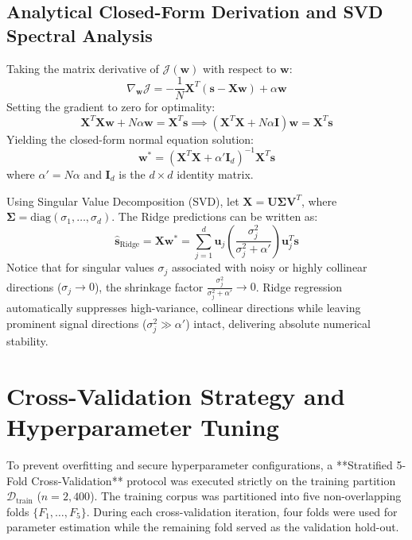 \documentclass[12pt,a4paper,oneside]{report}
\begin{document}
\subsection{Analytical Closed-Form Derivation and SVD Spectral Analysis}
Taking the matrix derivative of $\mathcal{J}(\mathbf{w})$ with respect to $\mathbf{w}$:
\begin{equation}
    \nabla_{\mathbf{w}} \mathcal{J} = -\frac{1}{N} \mathbf{X}^T (\mathbf{s} - \mathbf{X}\mathbf{w}) + \alpha \mathbf{w}
\end{equation}
Setting the gradient to zero for optimality:
\begin{equation}
    \mathbf{X}^T \mathbf{X}\mathbf{w} + N\alpha \mathbf{w} = \mathbf{X}^T \mathbf{s} \implies \left( \mathbf{X}^T \mathbf{X} + N\alpha \mathbf{I} \right) \mathbf{w} = \mathbf{X}^T \mathbf{s}
\end{equation}
Yielding the closed-form normal equation solution:
\begin{equation}
    \mathbf{w}^* = \left( \mathbf{X}^T \mathbf{X} + \alpha' \mathbf{I}_d \right)^{-1} \mathbf{X}^T \mathbf{s}
    \label{eq:ridge_solution}
\end{equation}
where $\alpha' = N\alpha$ and $\mathbf{I}_d$ is the $d \times d$ identity matrix.

Using Singular Value Decomposition (SVD), let $\mathbf{X} = \mathbf{U} \mathbf{\Sigma} \mathbf{V}^T$, where $\mathbf{\Sigma} = \text{diag}(\sigma_1, \dots, \sigma_d)$. The Ridge predictions can be written as:
\begin{equation}
    \hat{\mathbf{s}}_{\text{Ridge}} = \mathbf{X} \mathbf{w}^* = \sum_{j=1}^d \mathbf{u}_j \left( \frac{\sigma_j^2}{\sigma_j^2 + \alpha'} \right) \mathbf{u}_j^T \mathbf{s}
\end{equation}
Notice that for singular values $\sigma_j$ associated with noisy or highly collinear directions ($\sigma_j \to 0$), the shrinkage factor $\frac{\sigma_j^2}{\sigma_j^2 + \alpha'} \to 0$. Ridge regression automatically suppresses high-variance, collinear directions while leaving prominent signal directions ($\sigma_j^2 \gg \alpha'$) intact, delivering absolute numerical stability.

\section{Cross-Validation Strategy and Hyperparameter Tuning}
\label{sec:cross_validation}
To prevent overfitting and secure hyperparameter configurations, a **Stratified 5-Fold Cross-Validation** protocol was executed strictly on the training partition $\mathcal{D}_{\text{train}}$ ($n=2,400$). The training corpus was partitioned into five non-overlapping folds $\{F_1, \dots, F_5\}$. During each cross-validation iteration, four folds were used for parameter estimation while the remaining fold served as the validation hold-out.
\end{document}
